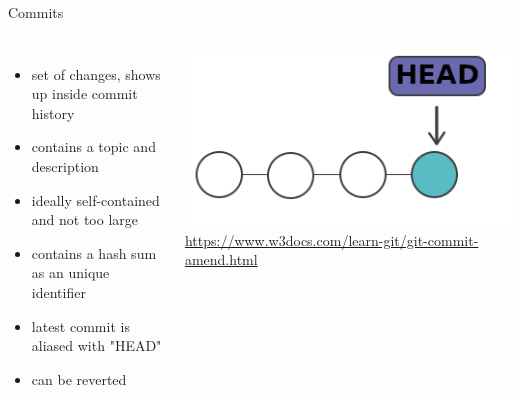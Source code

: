 \documentclass[10pt, graphics, aspectratio=169, table]{beamer}
\begin{document}
    \begin{frame}{Commits}
        \begin{columns}
                \begin{itemize}
                    \item set of changes, shows up inside commit history
                    \item contains a topic and description
                    \item ideally self-contained and not too large
                    \item contains a hash sum as an unique identifier
                    \item latest commit is aliased with "HEAD"
                    \item can be reverted
                \end{itemize}
                \center\includegraphics[scale=0.5]{img/commits.png}
                \center\tiny\url{https://www.w3docs.com/learn-git/git-commit-amend.html}
        \end{columns}
    \end{frame}
\end{document}
